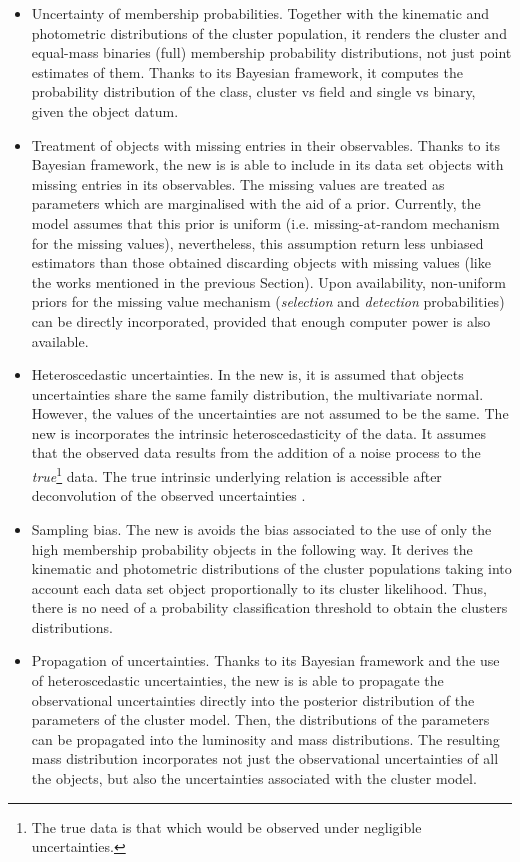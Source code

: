 \begin{itemize}
\item Uncertainty of membership probabilities. Together with the kinematic and photometric distributions of the cluster population, it renders the cluster and equal-mass binaries (full) membership probability distributions, not just point estimates of them. Thanks to its Bayesian framework, it computes the probability distribution of the class, cluster vs field and single vs binary, given the object datum. 

\item Treatment of objects with missing entries in their observables. Thanks to its Bayesian framework, the new \gls{is} is able to include in its data set objects with missing entries in its observables. The missing values are treated as parameters which are marginalised with the aid of a prior. Currently, the model assumes that this prior is uniform (i.e. missing-at-random mechanism for the missing values), nevertheless, this assumption return less unbiased estimators than those obtained discarding objects with missing values (like the works mentioned in the previous Section). Upon availability, non-uniform priors for the missing value mechanism (\emph{selection} and \emph{detection} probabilities) can be directly incorporated, provided that enough computer power is also available.

\item Heteroscedastic uncertainties. In the new \gls{is}, it is assumed that objects uncertainties share the same family distribution, the multivariate normal. However, the values of the uncertainties are not assumed to be the same. The new \gls{is} incorporates the intrinsic heteroscedasticity of the data. It assumes that the observed data results from the addition of a noise process to the \emph{true}\footnote{The true data is that which would be observed under negligible uncertainties.} data. The true intrinsic underlying relation is accessible after deconvolution of the observed uncertainties \cite[see][for another example of deconvolution]{2009ApJ...700.1794B}.

\item Sampling bias. The new \gls{is} avoids the bias associated to the use of only the high membership probability objects in the following way. It derives the kinematic and photometric distributions of the cluster populations taking into account each data set object proportionally to its cluster likelihood. Thus, there is no need of a probability classification threshold to obtain the clusters distributions.

\item Propagation of uncertainties. Thanks to its Bayesian framework and the use of heteroscedastic uncertainties, the new \gls{is} is able to propagate the observational uncertainties directly into the posterior distribution of the parameters of the cluster model. Then, the distributions of the parameters can be propagated into the luminosity and mass distributions. The resulting mass distribution incorporates not just the observational uncertainties of all the objects, but also the uncertainties associated with the cluster model. 
\end{itemize}

